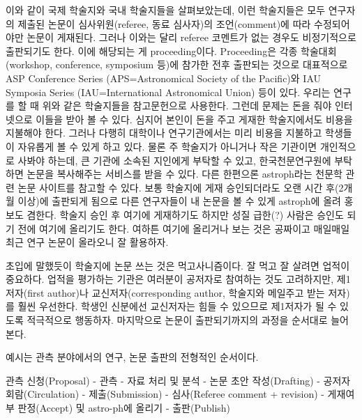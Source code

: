 \starbreak 이와 같이 국제 학술지와 국내 학술지들을 살펴보았는데, 이런 학술지들은
모두 연구자의 제출된 논문이 심사위원(referee, 동료 심사자)의 조언(comment)에 따라
수정되어야만 논문이 게재된다. 그러나 이와는 달리 referee 코멘트가 없는 경우도
비정기적으로 출판되기도 한다. 이에 해당되는 게 proceeding이다.  Proceeding은 각종
학술대회(workshop, conference, symposium 등)에 참가한 전후 출판되는 것으로
대표적으로 ASP Conference Series (APS=Astronomical Society of the Pacific)와 IAU
Symposia Series (IAU=International Astronomical Union) 등이 있다. 우리는 연구를
할 때 위와 같은 학술지들을 참고문헌으로 사용한다. 그런데 문제는 돈을 줘야
인터넷으로 이들을 받아 볼 수 있다. 심지어 본인이 돈을 주고 게재한 학술지에서도
비용을 지불해야 한다. 그러나 다행히 대학이나 연구기관에서는 미리 비용을 지불하고
학생들이 자유롭게 볼 수 있게 하고 있다. 물론 주 학술지가 아니거나 작은 기관이면
개인적으로 사봐야 하는데, 큰 기관에 소속된 지인에게 부탁할 수 있고,
한국천문연구원에 부탁하면 논문을 복사해주는 서비스를 받을 수 있다.  다른 한편으론
astroph라는 천문학 관련 논문 사이트를 참고할 수 있다. 보통 학술지에 게재
승인되더라도 오랜 시간 후(2개월 이상)에 출판되게 됨으로 다른 연구자들이 내 논문을
볼 수 있게 astroph에 올려 홍보도 겸한다. 학술지 승인 후 여기에 게재하기도 하지만
성질 급한(?) 사람은 승인도 되기 전에 여기에 올리기도 한다. 여하튼 여기에 올리거나
보는 것은 공짜이고 매일매일 최근 연구 논문이 올라오니 잘 활용하자.

초입에 말했듯이 학술지에 논문 쓰는 것은 먹고사니즘이다. 잘 먹고 잘 살려면 업적이
중요하다. 업적을 평가하는 기관은 여러분이 공저자로 참여하는 것도 고려하지만,
제1저자(first author)나 교신저자(corresponding author, 학술지와 메일주고 받는
저자)를 훨씬 우선한다. 학생인 신분에선 교신저자는 힘들 수 있으므로 제1저자가 될
수 있도록 적극적으로 행동하자.  마지막으로 논문이 출판되기까지의 과정을 순서대로
늘어본다.

예시는 관측 분야에서의 연구, 논문 출판의 전형적인 순서이다.
\begin{description}
\item \textsf{관측 신청(Proposal) - 관측 - 자료 처리 및 분석 - 논문 초안
    작성(Drafting) - 공저자 회람(Circulation) - 제출(Submission) - 심사(Referee
    comment + revision) - 게재여부 판정(Accept) 및 astro-ph에 올리기 -
    출판(Publish)}
\end{description}

